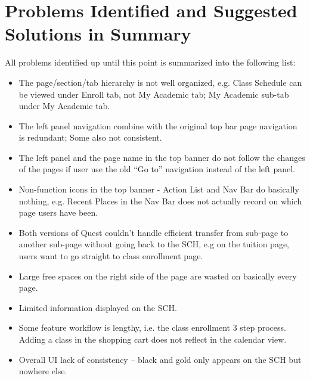 \documentclass[conference]{IEEEtran}
\begin{document}
\section{Problems Identified and Suggested Solutions in Summary}  \label{probelms and sulutions}
All problems identified up until this point is summarized into the following list:
\begin{itemize}
\item The page/section/tab hierarchy is not well organized, e.g. Class Schedule can be viewed under Enroll tab, not My Academic tab; My Academic sub-tab under My Academic tab.
\item The left panel navigation combine with the original top bar page navigation is redundant; Some also not consistent.
\item The left panel and the page name in the top banner do not follow the changes of the pages if user use the old ``Go to'' navigation instead of the left panel.
\item Non-function icons in the top banner - Action List and Nav Bar do basically nothing, e.g. Recent Places in the Nav Bar does not actually record on which page users have been.
\item Both versions of Quest couldn't handle efficient transfer from sub-page to another sub-page without going back to the SCH, e.g on the tuition page, users want to go straight to class enrollment page.
\item Large free spaces on the right side of the page are wasted on basically every page.
\item Limited information displayed on the SCH.
\item Some feature workflow is lengthy, i.e. the class enrollment 3 step process. Adding a class in the shopping cart does not reflect in the calendar view.
\item Overall UI lack of consistency – black and gold only appears on the SCH but nowhere else.
\end{itemize}
\end{document}
